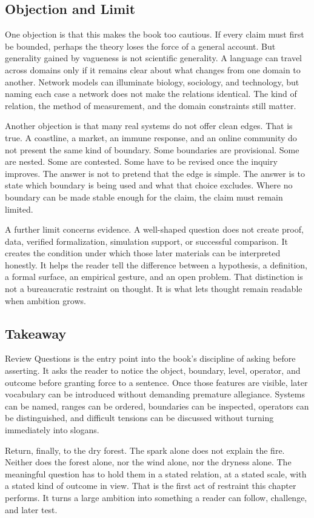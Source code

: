 \documentclass[11pt,a4paper,openany]{book}
\begin{document}
\subsection{Objection and Limit}
One objection is that this makes the book too cautious. If every claim must first be bounded, perhaps the theory loses the force of a general account. But generality gained by vagueness is not scientific generality. A language can travel across domains only if it remains clear about what changes from one domain to another. Network models can illuminate biology, sociology, and technology, but naming each case a network does not make the relations identical. The kind of relation, the method of measurement, and the domain constraints still matter. \cite{raf_networks,bak_soc}\par
Another objection is that many real systems do not offer clean edges. That is true. A coastline, a market, an immune response, and an online community do not present the same kind of boundary. Some boundaries are provisional. Some are nested. Some are contested. Some have to be revised once the inquiry improves. The answer is not to pretend that the edge is simple. The answer is to state which boundary is being used and what that choice excludes. Where no boundary can be made stable enough for the claim, the claim must remain limited.\par
A further limit concerns evidence. A well-shaped question does not create proof, data, verified formalization, simulation support, or successful comparison. It creates the condition under which those later materials can be interpreted honestly. It helps the reader tell the difference between a hypothesis, a definition, a formal surface, an empirical gesture, and an open problem. That distinction is not a bureaucratic restraint on thought. It is what lets thought remain readable when ambition grows.\par
\subsection{Takeaway}
Review Questions is the entry point into the book's discipline of asking before asserting. It asks the reader to notice the object, boundary, level, operator, and outcome before granting force to a sentence. Once those features are visible, later vocabulary can be introduced without demanding premature allegiance. Systems can be named, ranges can be ordered, boundaries can be inspected, operators can be distinguished, and difficult tensions can be discussed without turning immediately into slogans. \cite{raf_networks,bak_soc}\par
Return, finally, to the dry forest. The spark alone does not explain the fire. Neither does the forest alone, nor the wind alone, nor the dryness alone. The meaningful question has to hold them in a stated relation, at a stated scale, with a stated kind of outcome in view. That is the first act of restraint this chapter performs. It turns a large ambition into something a reader can follow, challenge, and later test.\par
\clearpage
\nocite{*}
\printbibliography[heading=bibintoc,title={Bibliography}]
\end{document}
